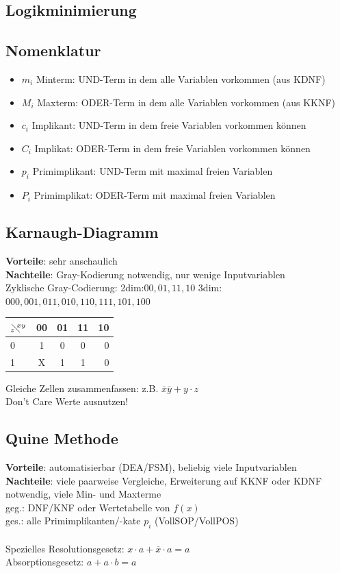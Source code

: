 \documentclass[6pt,a4paper]{scrartcl}
\begin{document}
\begin{multicols*}{3}
\section{Logikminimierung}
	\subsection{Nomenklatur}
	\begin{itemize}\itemsep0pt
	\item $m_i$ Minterm: UND-Term in dem alle Variablen vorkommen (aus KDNF)
	\item $M_i$ Maxterm: ODER-Term in dem alle Variablen vorkommen (aus KKNF)
	\item $c_i$ Implikant: UND-Term in dem freie Variablen vorkommen können
	\item $C_i$ Implikat: ODER-Term in dem freie Variablen vorkommen können
	\item $p_i$ Primimplikant: UND-Term mit maximal freien Variablen
	\item $P_i$ Primimplikat: ODER-Term mit maximal freien Variablen
	\end{itemize}

	\subsection{Karnaugh-Diagramm} %
	\textbf{Vorteile}: sehr anschaulich\\
	\textbf{Nachteile}: Gray-Kodierung notwendig, nur wenige Inputvariablen\\
		Zyklische Gray-Codierung: 2dim:$00,01,11,10$ 3dim:$000,001,011,010,110,111,101,100$
		
	\begin{tabular}{l | c | c |  c | r}
	$_z\!\!\diagdown \!\!^{xy}$ & 00 	& 	01	&	11 	&	10	 	\\ \midrule
	0		&	1 \cellcolor{gray}	&	0	&	0	&	0		\\	
	1		&	X \cellcolor{gray}	&	1 \cellcolor{lightgray}	&	1 \cellcolor{lightgray}	&	0		\\	
	\end{tabular}
	Gleiche Zellen zusammenfassen: z.B. $\overline x \overline y + y \cdot z$\\
	Don't Care Werte ausnutzen!

	\subsection{Quine Methode}
	\textbf{Vorteile}: automatisierbar (DEA/FSM), beliebig viele Inputvariablen\\
	\textbf{Nachteile}: viele paarweise Vergleiche, Erweiterung auf KKNF oder KDNF notwendig, viele Min- und Maxterme\\
	geg.: DNF/KNF oder Wertetabelle von $f(x)$ \\
	ges.: alle Primimplikanten/-kate $p_i$ (VollSOP/VollPOS)  \\ \\
	Spezielles Resolutionsgesetz: $x\cdot a + \overline x \cdot a = a$ \\
	Absorptionsgesetz: $a + a\cdot b = a$
	

\end{multicols*}
\end{document}
